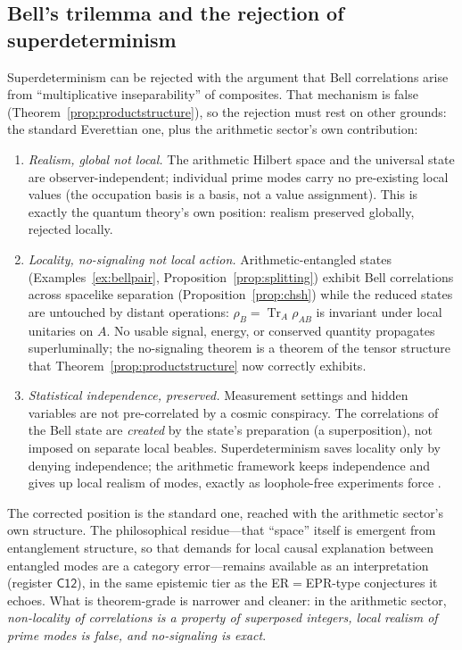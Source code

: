 \documentclass[11pt,a4paper]{article}
\theoremstyle{plain}
\theoremstyle{definition}
\theoremstyle{remark}
\DeclareMathOperator{\Tr}{Tr}
\begin{document}
\subsection{Bell's trilemma and the rejection of superdeterminism}

Superdeterminism can be rejected with the argument that Bell correlations arise from
``multiplicative inseparability'' of composites. That mechanism is false
(Theorem~\ref{prop:productstructure}), so the rejection must rest on other grounds: the standard
Everettian one, plus the arithmetic sector's own contribution:

\begin{enumerate}[leftmargin=1.6em]
\item \emph{Realism, global not local.} The arithmetic Hilbert space and the universal
state are observer-independent; individual prime modes carry no pre-existing local values
(the occupation basis is a basis, not a value assignment). This is exactly the
quantum theory's own position: realism preserved globally, rejected locally.
\item \emph{Locality, no-signaling not local action.} Arithmetic-entangled states
(Examples~\ref{ex:bellpair}, Proposition~\ref{prop:splitting}) exhibit Bell correlations
across spacelike separation (Proposition~\ref{prop:chsh}) while the reduced states are
untouched by distant operations: $\rho_{B}=\Tr_{A}\rho_{AB}$ is invariant under local
unitaries on $A$. No usable signal, energy, or conserved quantity propagates
superluminally; the no-signaling theorem is a theorem of the tensor structure that
Theorem~\ref{prop:productstructure} now correctly exhibits.
\item \emph{Statistical independence, preserved.} Measurement settings and hidden variables
are not pre-correlated by a cosmic conspiracy. The correlations of the Bell state are
\emph{created} by the state's preparation (a superposition), not imposed on separate
local beables. Superdeterminism saves locality only by denying independence; the arithmetic
framework keeps independence and gives up local realism of modes, exactly as
loophole-free experiments \cite{hensen2015} force \cite{bell1964,chsh1969}.
\end{enumerate}

The corrected position is the standard one, reached with the arithmetic sector's own
structure. The philosophical residue---that ``space'' itself is emergent from entanglement
structure, so that demands for local causal explanation between entangled modes are a
category error---remains available as an interpretation (register $\mathsf{C12}$), in the
same epistemic tier as the ER$=$EPR-type conjectures it echoes. What is theorem-grade is
narrower and cleaner: in the arithmetic sector, \emph{non-locality of correlations is a
property of superposed integers, local realism of prime modes is false, and no-signaling is
exact}.
\end{document}
